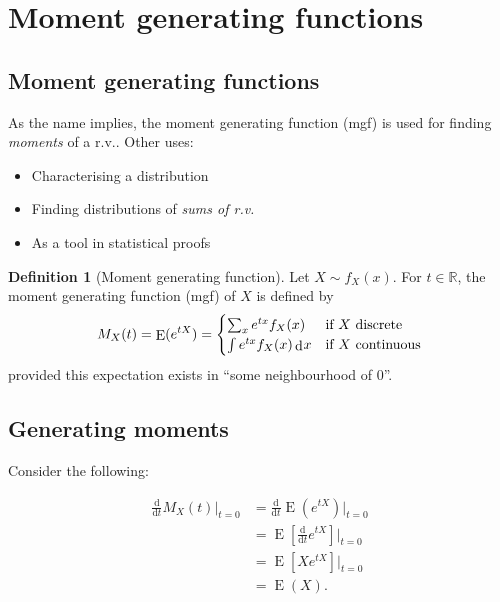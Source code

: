 \documentclass[
]{book}
\providecommand{\tightlist}{%
  \setlength{\itemsep}{0pt}\setlength{\parskip}{0pt}}
\DeclareMathOperator{\E}{E}
\newcommand{\bbR}{\mathbb{R}}
\DeclareMathOperator{\dd}{d}
\newcommand{\dint}{\dd\hspace{0.5pt}\!}
\newcommand{\ddif}{\text{d}}
\theoremstyle{definition}
\newtheorem{definition}{Definition}[chapter]
\theoremstyle{definition}
\theoremstyle{definition}
\theoremstyle{definition}
\theoremstyle{remark}
\begin{document}
\hypertarget{moment-generating-functions}{%
\section{Moment generating functions}\label{moment-generating-functions}}

\hypertarget{moment-generating-functions-1}{%
\subsection{Moment generating functions}\label{moment-generating-functions-1}}

As the name implies, the moment generating function (mgf) is used for finding \emph{moments} of a r.v..
Other uses:

\begin{itemize}
\tightlist
\item
  Characterising a distribution
\item
  Finding distributions of \emph{sums of r.v.}
\item
  As a tool in statistical proofs
\end{itemize}

\begin{definition}[Moment generating function]
Let $X\sim f_X(x)$. For $t\in\bbR$, the moment generating function (mgf) of $X$ is defined by
\[
M_X(t) = \E(e^{tX}) = \begin{cases}
\sum_x e^{tx} f_X(x) &\text{if $X$ discrete} \\
\int e^{tx} f_X(x) \dint x &\text{if $X$ continuous} \\
\end{cases}
\]
provided this expectation exists in ``some neighbourhood of 0''.
\end{definition}

\hypertarget{generating-moments}{%
\subsection{Generating moments}\label{generating-moments}}

Consider the following:

\begin{align*}
\frac{\ddif}{\ddif t}M_X(t) \bigg|_{t=0}
&= \frac{\ddif}{\ddif t}  \E(e^{tX}) \bigg|_{t=0} \\
&=  \E\left[  \frac{\ddif}{\ddif t}e^{tX} \right]\bigg|_{t=0} \\
&= \E[Xe^{tX}] \Big|_{t=0} \\ 
&= \E(X).
\end{align*}
\end{document}
